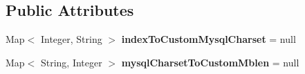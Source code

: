 \subsection*{Public Attributes}
\begin{DoxyCompactItemize}
\item 
\mbox{\label{classcom_1_1mysql_1_1cj_1_1protocol_1_1a_1_1_native_server_session_a05bb96d23cfc48cd8c3330bcf72bce21}} 
Map$<$ Integer, String $>$ {\bfseries index\+To\+Custom\+Mysql\+Charset} = null
\item 
\mbox{\label{classcom_1_1mysql_1_1cj_1_1protocol_1_1a_1_1_native_server_session_ae2143cf09383039fb6cc598e5a80bd38}} 
Map$<$ String, Integer $>$ {\bfseries mysql\+Charset\+To\+Custom\+Mblen} = null
\end{DoxyCompactItemize}
